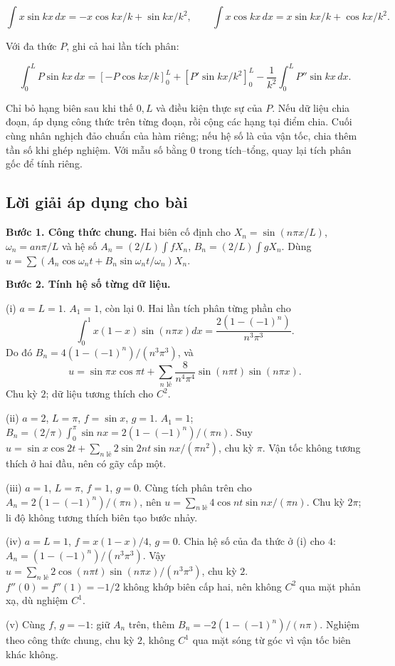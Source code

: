 \documentclass[10pt,a4paper]{article}
\begin{document}
\[
\int x\sin kx\,dx=-x\cos kx/k+\sin kx/k^2,\qquad
\int x\cos kx\,dx=x\sin kx/k+\cos kx/k^2.
\]


Với đa thức $P$, ghi cả hai lần tích phân:


\[
\int_0^L P\sin kx\,dx
=\left[-P\cos kx/k\right]_0^L+
\left[P'\sin kx/k^2\right]_0^L-
\frac1{k^2}\int_0^L P''\sin kx\,dx.
\]


Chỉ bỏ hạng biên sau khi thế $0,L$ và điều kiện thực sự của $P$. Nếu dữ liệu chia đoạn, áp dụng công thức trên từng đoạn, rồi cộng các hạng tại điểm chia. Cuối cùng nhân nghịch đảo chuẩn của hàm riêng; nếu hệ số là của vận tốc, chia thêm tần số khi ghép nghiệm. Với mẫu số bằng $0$ trong tích–tổng, quay lại tích phân gốc để tính riêng.
\subsection*{Lời giải áp dụng cho bài}
\textbf{Bước 1. Công thức chung.} Hai biên cố định cho $X_n=\sin(n\pi x/L)$, $\omega_n=an\pi/L$ và hệ số $A_n=(2/L)\int fX_n$, $B_n=(2/L)\int gX_n$. Dùng $u=\sum(A_n\cos\omega_nt+B_n\sin\omega_nt/\omega_n)X_n$.

\textbf{Bước 2. Tính hệ số từng dữ liệu.}

(i) $a=L=1$. $A_1=1$, còn lại $0$. Hai lần tích phân từng phần cho
\[\int_0^1x(1-x)\sin(n\pi x)dx=\frac{2(1-(-1)^n)}{n^3\pi^3}.\]
Do đó $B_n=4(1-(-1)^n)/(n^3\pi^3)$, và
\[u=\sin\pi x\cos\pi t+\sum_{n\text{ lẻ}}\frac8{n^4\pi^4}\sin(n\pi t)\sin(n\pi x).\]
Chu kỳ $2$; dữ liệu tương thích cho $C^2$.

(ii) $a=2$, $L=\pi$, $f=\sin x$, $g=1$. $A_1=1$; $B_n=(2/\pi)\int_0^\pi\sin nx=2(1-(-1)^n)/(\pi n)$. Suy $u=\sin x\cos2t+\sum_{n\text{ lẻ}}2\sin2nt\sin nx/(\pi n^2)$, chu kỳ $\pi$. Vận tốc không tương thích ở hai đầu, nên có gãy cấp một.

(iii) $a=1$, $L=\pi$, $f=1$, $g=0$. Cùng tích phân trên cho $A_n=2(1-(-1)^n)/(\pi n)$, nên $u=\sum_{n\text{ lẻ}}4\cos nt\sin nx/(\pi n)$. Chu kỳ $2\pi$; li độ không tương thích biên tạo bước nhảy.

(iv) $a=L=1$, $f=x(1-x)/4$, $g=0$. Chia hệ số của đa thức ở (i) cho $4$: $A_n=(1-(-1)^n)/(n^3\pi^3)$. Vậy $u=\sum_{n\text{ lẻ}}2\cos(n\pi t)\sin(n\pi x)/(n^3\pi^3)$, chu kỳ $2$. $f''(0)=f''(1)=-1/2$ không khớp biên cấp hai, nên không $C^2$ qua mặt phản xạ, dù nghiệm $C^1$.

(v) Cùng $f$, $g=-1$: giữ $A_n$ trên, thêm $B_n=-2(1-(-1)^n)/(n\pi)$. Nghiệm theo công thức chung, chu kỳ $2$, không $C^1$ qua mặt sóng từ góc vì vận tốc biên khác không.
\end{document}
